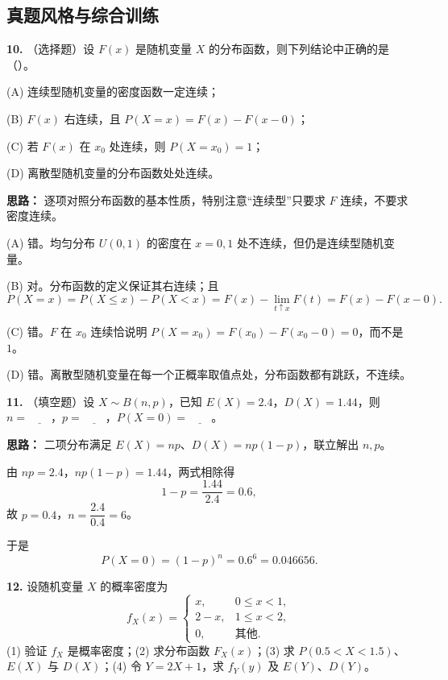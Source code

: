 \else \answerarea[8] \fi%

\subsection{真题风格与综合训练}

\textbf{10.} （选择题）设 $F(x)$ 是随机变量 $X$ 的分布函数，则下列结论中正确的是（\quad）。

(A) 连续型随机变量的密度函数一定连续；

(B) $F(x)$ 右连续，且 $P(X=x)=F(x)-F(x-0)$；

(C) 若 $F(x)$ 在 $x_0$ 处连续，则 $P(X=x_0)=1$；

(D) 离散型随机变量的分布函数处处连续。

\ifshowsolutions%
\textbf{思路：} 逐项对照分布函数的基本性质，特别注意“连续型”只要求 $F$ 连续，不要求密度连续。

(A) 错。均匀分布 $U(0,1)$ 的密度在 $x=0,1$ 处不连续，但仍是连续型随机变量。

(B) 对。分布函数的定义保证其右连续；且
\[
P(X=x)=P(X\leq x)-P(X<x)=F(x)-\lim_{t\uparrow x}F(t)=F(x)-F(x-0).
\]

(C) 错。$F$ 在 $x_0$ 连续恰说明 $P(X=x_0)=F(x_0)-F(x_0-0)=0$，而不是 $1$。

(D) 错。离散型随机变量在每一个正概率取值点处，分布函数都有跳跃，不连续。

\else \answerarea[8] \fi%

\textbf{11.} （填空题）设 $X\sim B(n,p)$，已知 $E(X)=2.4$，$D(X)=1.44$，则 $n=\underline{\qquad}$，$p=\underline{\qquad}$，$P(X=0)=\underline{\qquad}$。

\ifshowsolutions%
\textbf{思路：} 二项分布满足 $E(X)=np$、$D(X)=np(1-p)$，联立解出 $n,p$。

由 $np=2.4$，$np(1-p)=1.44$，两式相除得
\[
1-p=\frac{1.44}{2.4}=0.6,
\]
故 $p=0.4$，$n=\dfrac{2.4}{0.4}=6$。

于是
\[
P(X=0)=(1-p)^n=0.6^6=0.046656.
\]

\else \answerarea[8] \fi%

\textbf{12.} 设随机变量 $X$ 的概率密度为
\[
f_X(x)=\begin{cases}
x, & 0\leq x<1,\\
2-x, & 1\leq x<2,\\
0, & \text{其他}.
\end{cases}
\]
(1) 验证 $f_X$ 是概率密度；(2) 求分布函数 $F_X(x)$；(3) 求 $P(0.5<X<1.5)$、$E(X)$ 与 $D(X)$；(4) 令 $Y=2X+1$，求 $f_Y(y)$ 及 $E(Y)$、$D(Y)$。

